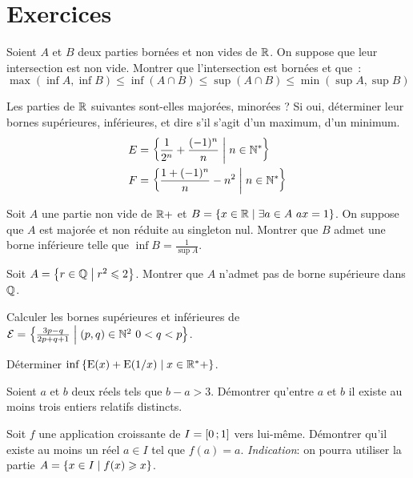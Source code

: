 \section{Exercices}
\begin{exercice}
    Soient \(A\) et \(B\) deux parties bornées et non vides de \(\mathbb{R}\). On suppose que leur intersection est non vide. Montrer que l'intersection est bornées et que~:
    \[ \max(\inf A, \inf B) \leqslant \inf(A \cap B) \leqslant \sup(A \cap B) \leqslant \min(\sup A, \sup B)\]
\end{exercice}
\begin{exercice}
    Les parties de \(\mathbb{R}\) suivantes sont-elles majorées, minorées ? Si oui, déterminer leur bornes supérieures, inférieures, et dire s'il s'agit d'un maximum, d'un minimum.
    \begin{align*}
        E &= \left\{\frac{1}{2^n}+\frac{(-1)^n}{n}\mathrel{}\middle|\mathrel{}n \in \mathbb{N}^*\right\} \\
        F &= \left\{\frac{1+(-1)^n}{n}-n^2\mathrel{}\middle|\mathrel{}n \in \mathbb{N}^*\right\}
    \end{align*}
\end{exercice}
\begin{exercice}
    Soit \(A\) une partie non vide de \(\mathbb{R}+\) et \(B = \enstq{x \in \R}{\exists a \in A \ ax=1}\). On suppose que \(A\) est majorée et non réduite au singleton nul. Montrer que \(B\) admet une borne inférieure telle que \(\inf B = \frac{1}{\sup A}\).
\end{exercice}
\begin{exercice}
    Soit \(A = \left\{r \in \mathbb{Q}\mathrel{}\middle|\mathrel{}r^2 \leqslant 2\right\}\). Montrer que \(A\) n'admet pas de borne supérieure dans \(\mathbb{Q}\).
\end{exercice}
\begin{exercice}
    Calculer les bornes supérieures et inférieures de \(\mathcal{E} = \left\{\frac{3p-q}{2p+q+1}\mathrel{}\middle|\mathrel{}(p,q) \in \mathbb{N}^2 \ 0 <q<p\right\}\).
\end{exercice}
\begin{exercice}
    Déterminer \(\inf \left\{\operatorname{E}(x) + \operatorname{E}(1/x)\mathrel{}\middle|\mathrel{}x \in \mathbb{R}^*+\right\}\).
\end{exercice}
\begin{exercice}
    Soient \(a\) et \(b\) deux réels tels que \(b-a>3\). Démontrer qu'entre \(a\) et \(b\) il existe au moins trois entiers relatifs distincts.
\end{exercice}
\begin{exercice}
    Soit \(f\) une application croissante de \(I = \left[ 0 \, ;  1 \right]\) vers lui-même. Démontrer qu'il existe au moins un réel \(a \in I\) tel que \(f(a)=a\).
    \emph{Indication}: on pourra utiliser la partie \(A = \left\{x \in I\mathrel{}\middle|\mathrel{}f(x) \geqslant x\right\}\).
\end{exercice}
